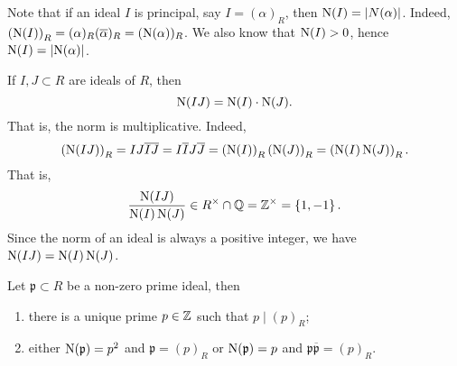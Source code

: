 Note that if an ideal \(I\) is principal, say \(I = (\alpha)_R\),
then \(\operatorname{N}(I) = \left\lvert N(\alpha) \right\rvert\).
Indeed,
\(
    \left( \operatorname{N}(I) \right)_R
    = (\alpha)_R (\overline\alpha)_R
    = (\operatorname{N}(\alpha))_R
\).
We also know that \(\operatorname{N}(I) > 0\),
hence \(\operatorname{N}(I) = \left\lvert \operatorname{N}(\alpha) \right\rvert\).

If \(I, J \subset R\) are ideals of \(R\),
then
\[\operatorname{N}(IJ) = \operatorname{N}(I) \cdot \operatorname{N}(J).\]
That is, the norm is multiplicative.
Indeed,
\[
    \left( \operatorname{N}(IJ) \right)_R
    = IJ \overline{IJ}
    = I \overline I J \overline J
    = \left( \operatorname{N}(I) \right)_R \left( \operatorname{N}(J) \right)_R
    = \left( \operatorname{N}(I) \operatorname{N}(J) \right)_R.
\]
That is, 
\[
    \frac{\operatorname{N}(IJ)}{\operatorname{N}(I)\operatorname{N}(J)} \in R^\times \cap \mathbb{Q}
    = \mathbb{Z}^\times
    = \left\{ 1, -1 \right\}.
\]
Since the norm of an ideal is always a positive integer, we have
\(\operatorname{N}(IJ) = \operatorname{N}(I) \operatorname{N}(J)\).

\begin{theorem}
    Let \(\mathfrak p \subset R\)
    be a non-zero prime ideal, then
    \begin{enumerate}
        \item there is a unique prime \(p \in \mathbb{Z}\) such that
        \(p \mid (p)_R\);

        \item either \(\operatorname{N}(\mathfrak p) = p^2\) and \(\mathfrak p = (p)_R\)
        or \(\operatorname{N}(\mathfrak p) = p\) and 
        \(\mathfrak p \overline{\mathfrak p} = (p)_R\).
    \end{enumerate}
\end{theorem}

